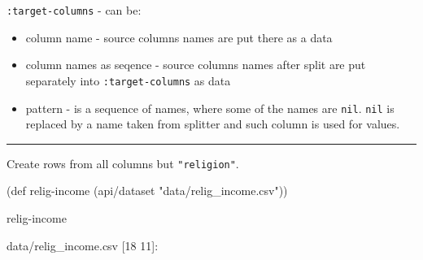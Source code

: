 \documentclass[]{article}
\newenvironment{Shaded}{\begin{snugshade}}{\end{snugshade}}
\newcommand{\StringTok}[1]{\textcolor[rgb]{0.31,0.60,0.02}{#1}}
\newcommand{\FunctionTok}[1]{\textcolor[rgb]{0.00,0.00,0.00}{#1}}
\newcommand{\BuiltInTok}[1]{#1}
\newcommand{\NormalTok}[1]{#1}
\providecommand{\tightlist}{%
  \setlength{\itemsep}{0pt}\setlength{\parskip}{0pt}}
\begin{document}
\texttt{:target-columns} - can be:

\begin{itemize}
\tightlist
\item
  column name - source columns names are put there as a data
\item
  column names as seqence - source columns names after split are put
  separately into \texttt{:target-columns} as data
\item
  pattern - is a sequence of names, where some of the names are
  \texttt{nil}. \texttt{nil} is replaced by a name taken from splitter
  and such column is used for values.
\end{itemize}

\begin{center}\rule{0.5\linewidth}{0.5pt}\end{center}

Create rows from all columns but \texttt{"religion"}.

\begin{Shaded}
\begin{Highlighting}[]
\NormalTok{(}\BuiltInTok{def}\FunctionTok{ relig-income }\NormalTok{(api/dataset }\StringTok{"data/relig_income.csv"}\NormalTok{))}
\end{Highlighting}
\end{Shaded}

\begin{Shaded}
\begin{Highlighting}[]
\NormalTok{relig-income}
\end{Highlighting}
\end{Shaded}

data/relig\_income.csv {[}18 11{]}:
\end{document}
